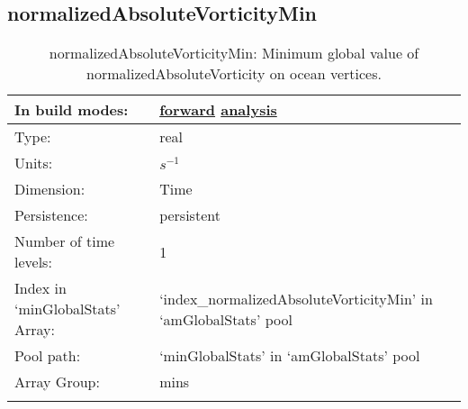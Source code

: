 \subsection[normalizedAbsoluteVorticityMin]{normalizedAbsoluteVorticityMin}
\label{subsec:var_sec_amGlobalStats_normalizedAbsoluteVorticityMin}
\begin{center}
\begin{longtable}{| p{2.0in} | p{4.0in} |}
        \hline 
        In build modes: & \hyperref[subsec:forward_var_tab_amGlobalStats]{forward} \hyperref[subsec:analysis_var_tab_amGlobalStats]{analysis} \\
        \hline 
        Type: & real \\
        \hline 
        Units: & $s^{-1}$ \\
        \hline 
        Dimension: & Time \\
        \hline 
        Persistence: & persistent \\
        \hline 
        Number of time levels: & 1 \\
        \hline 
		 Index in `minGlobalStats' Array: & `index\_normalizedAbsoluteVorticityMin' in `amGlobalStats' pool \\
		 \hline 
            Pool path: & `minGlobalStats' in `amGlobalStats' pool \\
		 \hline 
		 Array Group: & mins \\
		 \hline 
    \caption{normalizedAbsoluteVorticityMin: Minimum global value of normalizedAbsoluteVorticity on ocean vertices.}
\end{longtable}
\end{center}
